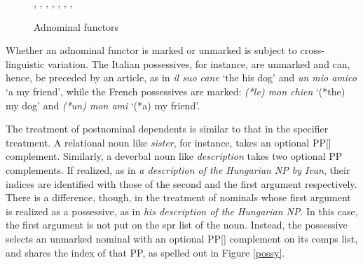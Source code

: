 \documentclass[output=paper]{langsci/langscibook}
\begin{document}
\begin{figure}
\begin{center}
\footnotesize
\tree
{,
  {,
    {}},
  {,
    {,
      {}},  
    {,
      {}}}}
\caption{\label{markyy} Adnominal functors }
\normalsize
\end{center}
\end{figure}

Whether an adnominal functor is marked or unmarked is subject to cross-linguistic variation. 
The Italian possessives, for instance, are unmarked and can, hence, be preceded 
by an article, as in \emph{il suo cane} `the his dog' and \emph{un mio amico} `a my friend', 
while the French possessives are marked: \emph{(*le) mon chien} `(*the) my dog' 
and \emph{(*un) mon ami} `(*a) my friend'. 

The treatment of postnominal dependents is similar to that in the specifier treatment. 
A relational noun like \emph{sister}, for instance, takes an optional PP[] complement.  
Similarly, a deverbal noun like \emph{description} takes two optional PP complements. 
If realized, as in \emph{a description of the Hungarian NP by Ivan}, 
their indices are identified with those of the second and the first argument respectively. 
There is a difference, though, in the treatment of nominals 
whose first argument is realized as a possessive, as in 
\emph{his description of the Hungarian NP}. In this case, the first argument is not put on the 
{\sc spr} list of the noun. Instead, the possessive selects an unmarked nominal with an optional 
PP[] complement on its {\sc comps} list, and shares the index of that PP, 
as spelled out in Figure \ref{possy}. 
\end{document}
